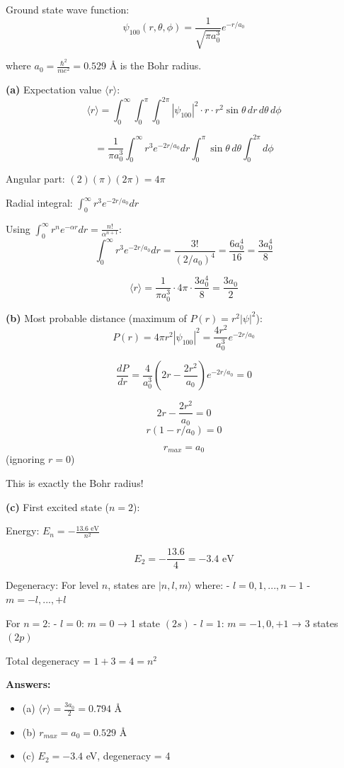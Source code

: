 \documentclass[12pt,a4paper]{article}
\begin{document}
\begin{solution}
Ground state wave function:
$$\psi_{100}(r,\theta,\phi) = \frac{1}{\sqrt{\pi a_0^3}}e^{-r/a_0}$$

where $a_0 = \frac{\hbar^2}{me^2} = 0.529$ Å is the Bohr radius.

\textbf{(a)} Expectation value $\langle r \rangle$:
$$\langle r \rangle = \int_0^{\infty}\int_0^{\pi}\int_0^{2\pi} |\psi_{100}|^2 \cdot r \cdot r^2\sin\theta\,dr\,d\theta\,d\phi$$

$$= \frac{1}{\pi a_0^3}\int_0^{\infty} r^3 e^{-2r/a_0}dr \int_0^{\pi}\sin\theta\,d\theta\int_0^{2\pi}d\phi$$

Angular part: $(2)(\pi)(2\pi) = 4\pi$

Radial integral: $\int_0^{\infty} r^3 e^{-2r/a_0}dr$

Using $\int_0^{\infty} r^n e^{-\alpha r}dr = \frac{n!}{\alpha^{n+1}}$:
$$\int_0^{\infty} r^3 e^{-2r/a_0}dr = \frac{3!}{(2/a_0)^4} = \frac{6a_0^4}{16} = \frac{3a_0^4}{8}$$

$$\langle r \rangle = \frac{1}{\pi a_0^3} \cdot 4\pi \cdot \frac{3a_0^4}{8} = \frac{3a_0}{2}$$

\textbf{(b)} Most probable distance (maximum of $P(r) = r^2|\psi|^2$):
$$P(r) = 4\pi r^2|\psi_{100}|^2 = \frac{4r^2}{a_0^3}e^{-2r/a_0}$$

$$\frac{dP}{dr} = \frac{4}{a_0^3}\left(2r - \frac{2r^2}{a_0}\right)e^{-2r/a_0} = 0$$

$$2r - \frac{2r^2}{a_0} = 0$$
$$r(1 - r/a_0) = 0$$

$$r_{max} = a_0$$ (ignoring $r = 0$)

This is exactly the Bohr radius!

\textbf{(c)} First excited state ($n = 2$):

Energy: $E_n = -\frac{13.6\text{ eV}}{n^2}$

$$E_2 = -\frac{13.6}{4} = -3.4\text{ eV}$$

Degeneracy: For level $n$, states are $|n, l, m\rangle$ where:
- $l = 0, 1, ..., n-1$
- $m = -l, ..., +l$

For $n = 2$:
- $l = 0$: $m = 0$ → 1 state $(2s)$
- $l = 1$: $m = -1, 0, +1$ → 3 states $(2p)$

Total degeneracy = $1 + 3 = 4 = n^2$

\textbf{Answers:}
\begin{itemize}
    \item (a) $\langle r \rangle = \frac{3a_0}{2} = 0.794$ Å
    \item (b) $r_{max} = a_0 = 0.529$ Å
    \item (c) $E_2 = -3.4$ eV, degeneracy = 4
\end{itemize}
\end{solution}
\end{document}
